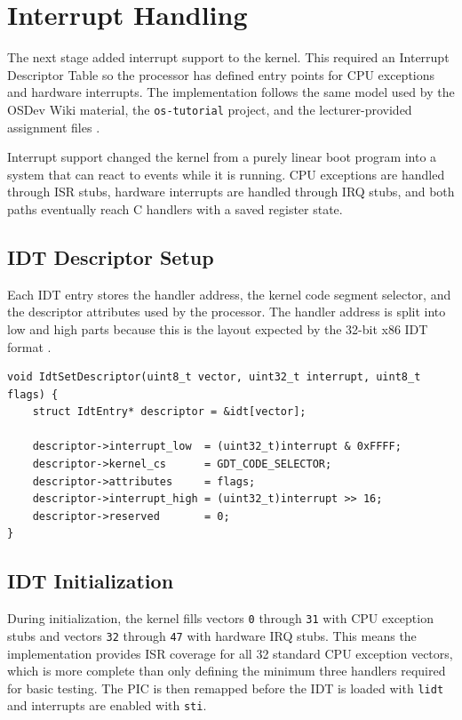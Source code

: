 \newpage

\section{Interrupt Handling}

The next stage added interrupt support to the kernel. This required an Interrupt Descriptor Table so the processor has defined entry points for CPU exceptions and hardware interrupts. The implementation follows the same model used by the OSDev Wiki material, the \texttt{os-tutorial} project, and the lecturer-provided assignment files \cite{osdevInterruptsTutorial,fenollosaOsTutorial,assignmentFiles}.

Interrupt support changed the kernel from a purely linear boot program into a system that can react to events while it is running. CPU exceptions are handled through ISR stubs, hardware interrupts are handled through IRQ stubs, and both paths eventually reach C handlers with a saved register state.

\subsection{IDT Descriptor Setup}
Each IDT entry stores the handler address, the kernel code segment selector, and the descriptor attributes used by the processor. The handler address is split into low and high parts because this is the layout expected by the 32-bit x86 IDT format \cite{osdevInterruptsTutorial}.

\begin{listing}[H]
\begin{verbatim}
void IdtSetDescriptor(uint8_t vector, uint32_t interrupt, uint8_t flags) {
    struct IdtEntry* descriptor = &idt[vector];

    descriptor->interrupt_low  = (uint32_t)interrupt & 0xFFFF;
    descriptor->kernel_cs      = GDT_CODE_SELECTOR;
    descriptor->attributes     = flags;
    descriptor->interrupt_high = (uint32_t)interrupt >> 16;
    descriptor->reserved       = 0;
}
\end{verbatim}
\caption{Constructing an IDT gate for a specific interrupt vector.}
\end{listing}
\clearpage

\subsection{IDT Initialization}
During initialization, the kernel fills vectors \texttt{0} through \texttt{31} with CPU exception stubs and vectors \texttt{32} through \texttt{47} with hardware IRQ stubs. This means the implementation provides ISR coverage for all 32 standard CPU exception vectors, which is more complete than only defining the minimum three handlers required for basic testing. The PIC is then remapped before the IDT is loaded with \texttt{lidt} and interrupts are enabled with \texttt{sti}.

